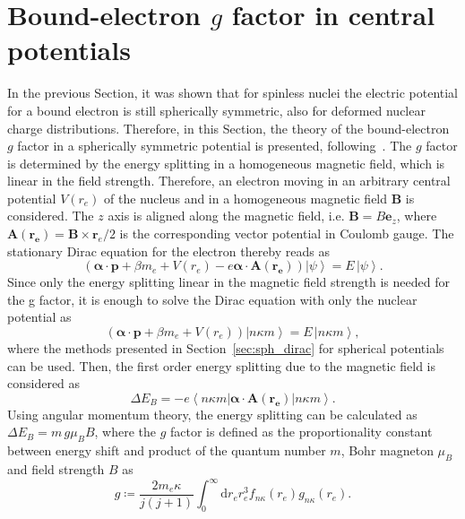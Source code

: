 \section{Bound-electron $g$ factor in central potentials}
In the previous Section, it was shown that for spinless nuclei the electric potential for a bound electron is still spherically symmetric, also for deformed nuclear charge distributions. Therefore, in this Section, the theory of the bound-electron $g$ factor in a spherically symmetric potential is presented, following~\cite{rose1961,Karshenboim2005}. The $g$ factor is determined by the energy splitting in a homogeneous magnetic field, which is linear in the field strength. Therefore, an electron moving in an arbitrary central potential $V(r_e)$ of the nucleus and in a homogeneous magnetic field $\mathbf{B}$ is considered. The $z$ axis is aligned along the magnetic field, i.e. $\mathbf{B}=B\mathbf{e}_z$, where $\mathbf{A}(\mathbf{r_e})=\mathbf{B}\times \mathbf{r}_e /2$ is the corresponding vector potential in Coulomb gauge. The stationary Dirac equation for the electron thereby reads as
\begin{equation}
\left(\boldsymbol{\alpha}\cdot\mathbf{p}+\beta m_e + V(r_e) -e\boldsymbol{\alpha}\cdot\mathbf{A}(\mathbf{r_e})\right)\left|\psi\right> = E\,\left|\psi\right>.
\end{equation}
Since only the energy splitting linear in the magnetic field strength is needed for the g factor, it is enough to solve the Dirac equation with only the nuclear potential as
\begin{equation}
\left(\boldsymbol{\alpha}\cdot\mathbf{p}+\beta m_e + V(r_e) \right)\left|n\kappa m\right> = E\,\left|n\kappa m\right>,
\end{equation}
where the methods presented in Section~\ref{sec:sph_dirac} for spherical potentials can be used. Then, the first order energy splitting due to the magnetic field is considered as
\begin{equation}
\Delta E_B = -e\left<n\kappa m\right|\boldsymbol{\alpha}\cdot\mathbf{A}(\mathbf{r_e})\left|n\kappa m\right>.
\end{equation}
Using angular momentum theory, the energy splitting can be calculated as \mbox{$\Delta E_B = m\, g \mu_B B$}, where the $g$ factor is defined as the proportionality constant between energy shift and product of the quantum number $m$, Bohr magneton $\mu_B$ and field strength $B$ as
\begin{equation}
g\coloneqq\frac{2m_e\kappa}{j(j+1)}\int_0^\infty\mathrm{d}r_e r_e^3 f_{n\kappa}(r_e)g_{n\kappa}(r_e).
\label{eq:gfac_central}
\end{equation}
